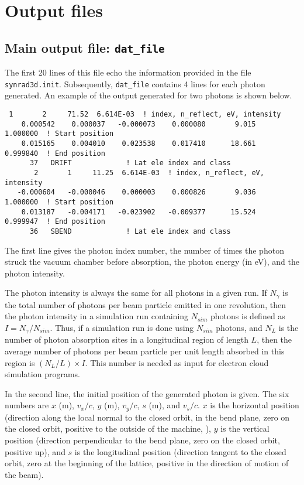 \documentclass[11pt,landscape]{article}
\begin{document}
\section{Output files} 

\subsection{Main output file:
\texttt{dat\_file}} The first 20 lines of this file echo the
information provided in the file \texttt{synrad3d.init}.
Subsequently, \texttt{dat\_file} contains 4 lines for each photon
generated. An example of the output generated for two photons is shown
below.
\begin{verbatim}
 1       2     71.52  6.614E-03  ! index, n_reflect, eV, intensity
    0.000542    0.000037   -0.000073    0.000080       9.015    1.000000  ! Start position
    0.015165    0.004010    0.023538    0.017410      18.661    0.999840  ! End position
      37   DRIFT             ! Lat ele index and class
       2       1     11.25  6.614E-03  ! index, n_reflect, eV, intensity
   -0.000604   -0.000046    0.000003    0.000826       9.036    1.000000  ! Start position
    0.013187   -0.004171   -0.023902   -0.009377      15.524    0.999947  ! End position
      36   SBEND             ! Lat ele index and class
\end{verbatim}
The first line gives the photon index number, the number of times the
photon struck the vacuum chamber before absorption, the photon energy
(in eV), and the photon intensity.

The photon intensity is always the same for all photons in a given
run. If $N_{\gamma}$ is the total number of photons per beam particle
emitted in one revolution, then the photon intensity in a simulation
run containing $N_{sim}$ photons is defined as $I=N_{\gamma}/N_{sim}.$
Thus, if a simulation run is done using $N_{sim}$ photons, and $N_L$
is the number of photon absorption sites in a longitudinal region of
length $L$, then the average number of photons per beam particle per
unit length absorbed in this region is $(N_L/L)\times I.$ This number
is needed as input for electron cloud simulation programs.

In the second line, the initial position of the generated photon is
given. The six numbers are $x$ (m), $v_x/c$, $y$ (m), $v_y/c$, $s$
(m), and $v_s/c.$ $x$ is the horizontal position (direction along the
local normal to the closed orbit, in the bend plane, zero on the
closed orbit, positive to the outside of the machine, ), $y$ is the
vertical position (direction perpendicular to the bend plane, zero on
the closed orbit, positive up), and $s$ is the longitudinal position
(direction tangent to the closed orbit, zero at the beginning of the
lattice, positive in the direction of motion of the beam).
\end{document}
